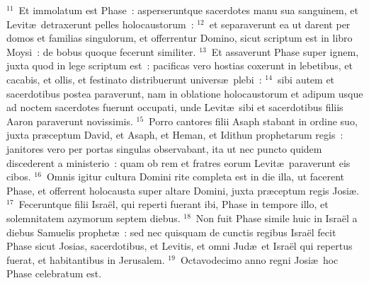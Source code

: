 ${}^{11}$~Et immolatum est Phase~: asperseruntque sacerdotes manu sua sanguinem, et Levit\ae\ detraxerunt pelles holocaustorum~:
${}^{12}$~et separaverunt ea ut darent per domos et familias singulorum, et offerrentur Domino, sicut scriptum est in libro Moysi~: de bobus quoque fecerunt similiter.
${}^{13}$~Et assaverunt Phase super ignem, juxta quod in lege scriptum est~: pacificas vero hostias coxerunt in lebetibus, et cacabis, et ollis, et festinato distribuerunt univers\ae\ plebi~:
${}^{14}$~sibi autem et sacerdotibus postea paraverunt, nam in oblatione holocaustorum et adipum usque ad noctem sacerdotes fuerunt occupati, unde Levit\ae\ sibi et sacerdotibus filiis Aaron paraverunt novissimis.
${}^{15}$~Porro cantores filii Asaph stabant in ordine suo, juxta pr\ae ceptum David, et Asaph, et Heman, et Idithun prophetarum regis~: janitores vero per portas singulas observabant, ita ut nec puncto quidem discederent a ministerio~: quam ob rem et fratres eorum Levit\ae\ paraverunt eis cibos.
${}^{16}$~Omnis igitur cultura Domini rite completa est in die illa, ut facerent Phase, et offerrent holocausta super altare Domini, juxta pr\ae ceptum regis Josi\ae .
${}^{17}$~Feceruntque filii Isra\"el, qui reperti fuerant ibi, Phase in tempore illo, et solemnitatem azymorum septem diebus.
${}^{18}$~Non fuit Phase simile huic in Isra\"el a diebus Samuelis prophet\ae~: sed nec quisquam de cunctis regibus Isra\"el fecit Phase sicut Josias, sacerdotibus, et Levitis, et omni Jud\ae\ et Isra\"el qui repertus fuerat, et habitantibus in Jerusalem.
${}^{19}$~Octavodecimo anno regni Josi\ae\ hoc Phase celebratum est.


